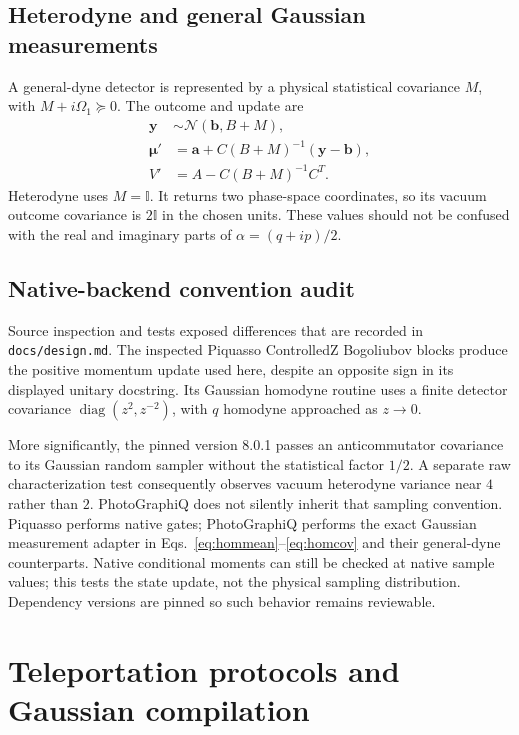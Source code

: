\documentclass[a4paper,twocolumn,11pt,nopdfoutputerror]{quantumarticle}
\newcommand{\I}{\mathbb{I}}
\newcommand{\diag}{\operatorname{diag}}
\begin{document}
\subsection{Heterodyne and general Gaussian measurements}

A general-dyne detector is represented by a physical statistical covariance
$M$, with $M+i\Omega_1\succeq0$. The outcome and update are
\begin{align}
 \bm y&\sim\mathcal N(\bm b,B+M),\\
 \bm\mu'&=\bm a+C(B+M)^{-1}(\bm y-\bm b),\\
 V'&=A-C(B+M)^{-1}C^T.
\end{align}
Heterodyne uses $M=\I$. It returns two phase-space coordinates, so its vacuum
outcome covariance is $2\I$ in the chosen units. These values should not be
confused with the real and imaginary parts of $\alpha=(q+ip)/2$.

\subsection{Native-backend convention audit}

Source inspection and tests exposed differences that are recorded in
\texttt{docs/design.md}. The inspected Piquasso ControlledZ Bogoliubov blocks
produce the positive momentum update used here, despite an opposite sign in
its displayed unitary docstring. Its Gaussian homodyne routine uses a
finite detector covariance $\diag(z^2,z^{-2})$, with $q$ homodyne approached
as $z\to0$.

More significantly, the pinned version 8.0.1 passes an anticommutator covariance
to its Gaussian random sampler without the statistical factor $1/2$. A separate
raw characterization test consequently observes vacuum heterodyne variance near
$4$ rather than $2$. PhotoGraphiQ does not silently inherit that sampling
convention. Piquasso performs native gates; PhotoGraphiQ performs the exact
Gaussian measurement adapter in Eqs.~\eqref{eq:hommean}--\eqref{eq:homcov} and
their general-dyne counterparts. Native conditional moments can still be checked
at native sample values; this tests the state update, not the physical sampling
distribution. Dependency versions are pinned so such behavior remains reviewable.

\section{Teleportation protocols and Gaussian compilation}
\end{document}
